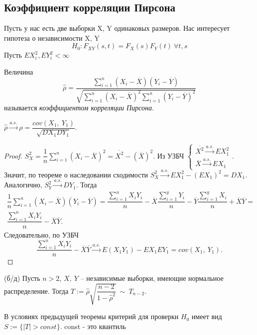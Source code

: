 \subsection{Коэффициент корреляции Пирсона}
Пусть у нас есть две выборки X, Y одинаковых размеров. Нас интересует гипотеза о независимости X, Y
$$H_0: F_{XY}(s,t) = F_X(s)F_Y(t)\ \forall t,s$$
Пусть $EX_i^2, EY_i^2 < \infty$
\begin{definition}
    Величина
    \begin{equation*}
        \hat{\rho } =\dfrac{\sum _{i=1}^{n}( X_{i} -\overline{X})( Y_{i} -\overline{Y})}{\sqrt{\sum _{i=1}^{n}( X_{i} -\overline{X})^{2}\sum _{i=1}^{n}( Y_{i} -\overline{Y})^{2}}}
    \end{equation*}
    называется \textit{коэффициентом корреляции Пирсона}.
\end{definition}
\begin{proposition}
    $\displaystyle \hat{\rho }\xrightarrow{a.s.} \rho =\dfrac{cov( X_{1} ,\ Y_{1})}{\sqrt{DX_{1} DY_{1}}}$.
\end{proposition}
\begin{proof}
    $\displaystyle S_{X}^{2} =\dfrac{1}{n}\sum _{i=1}^{n}( X_{i} -\overline{X})^{2} =\overline{X^{2}} -(\overline{X})^{2}$. Из УЗБЧ $\displaystyle \begin{cases}
    \overline{X^{2}}\xrightarrow{a.s.} EX_{1}^{2}\\
    \overline{X}\xrightarrow{a.s.} EX_{1}
    \end{cases}$. Значит, по теореме о наследовании сходимости $\displaystyle S_{X}^{2}\xrightarrow{a.s.} EX_{1}^{2} -( EX_{1})^{2} =DX_{1}$. Аналогично, $\displaystyle S_{Y}^{2}\xrightarrow{a.s.} DY_{1}$. Тогда
    \begin{gather*}
        \dfrac{1}{n}\sum _{i=1}^{n}( X_{i} -\overline{X})( Y_{i} -\overline{Y}) =\dfrac{\sum _{i=1}^{n} X_{i} Y_{i}}{n} -\overline{X}\dfrac{\sum _{i=1}^{y} Y_{i}}{n} -\overline{Y}\dfrac{\sum _{i=1}^{y} X_{i}}{n} +\overline{X}\overline{Y} =\\
        \dfrac{\sum _{i=1}^{n} X_{i} Y_{i}}{n} -\overline{X}\overline{Y} .
    \end{gather*}
    Следовательно, по УЗБЧ
    \begin{equation*}
        \dfrac{\sum _{i=1}^{n} X_{i} Y_{i}}{n} -\overline{X}\overline{Y}\xrightarrow{a.s.} E( X_{1} Y_{1}) -EX_{1} EY_{1} =cov( X_{1} ,\ Y_{1}) .
    \end{equation*}
\end{proof}
\begin{theorem}
    (б/д) Пусть $\displaystyle n >2$, $\displaystyle X,\ Y$ -- независимые выборки, имеющие нормальное распределение. Тогда $\displaystyle T:=\hat{\rho }\sqrt{\dfrac{n-2}{1-\hat{\rho }^{2}}} \ \sim \ T_{n-2}$.
\end{theorem}
В условиях предыдущей теоремы критерий для проверки $\displaystyle H_{0}$ имеет вид $\displaystyle S:=\{| T|  >const\}$. const - это квантиль
